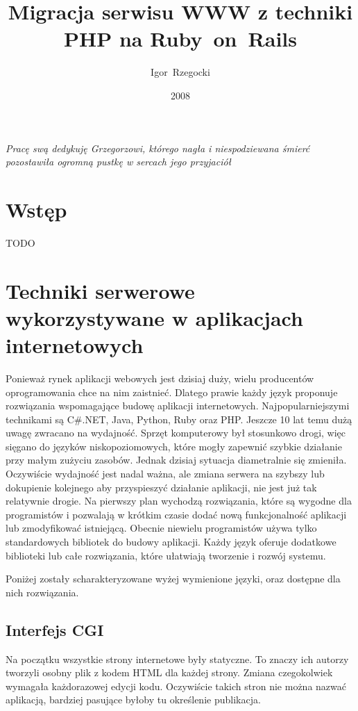 \documentclass[a4paper,12pt,oneside]{report}
\author{Igor~Rzegocki}
\title{Migracja serwisu WWW z techniki PHP na Ruby~on~Rails}
\date{2008}
\begin{document}

\thispagestyle{empty}
\begin{flushright}
\vspace*{13cm}
\emph{Pracę swą dedykuję Grzegorzowi, którego nagła i niespodziewana śmierć pozostawiła ogromną pustkę w sercach jego przyjaciół}
\end{flushright}


\tableofcontents

\chapter{Wstęp}
\label{cha:wstep}

TODO

\chapter[Techniki po stronie serwera]{Techniki serwerowe wykorzystywane w aplikacjach internetowych}
\label{cha:serwer}

Ponieważ rynek aplikacji webowych jest dzisiaj duży, wielu producentów oprogramowania chce na nim zaistnieć. Dlatego prawie każdy język proponuje rozwiązania wspomagające budowę aplikacji internetowych. Najpopularniejszymi technikami są C\#.NET, Java, Python, Ruby oraz PHP. Jeszcze 10 lat temu dużą uwagę zwracano na wydajność. Sprzęt komputerowy był stosunkowo drogi, więc sięgano do języków niskopoziomowych, które mogły zapewnić szybkie działanie przy małym zużyciu zasobów. Jednak dzisiaj sytuacja diametralnie się zmieniła. Oczywiście wydajność jest nadal ważna, ale zmiana serwera na szybszy lub dokupienie kolejnego aby przyspieszyć działanie aplikacji, nie jest już tak relatywnie drogie. Na pierwszy plan wychodzą rozwiązania, które są wygodne dla programistów i pozwalają w krótkim czasie dodać nową funkcjonalność aplikacji lub zmodyfikować istniejącą. Obecnie niewielu programistów używa tylko standardowych bibliotek do budowy aplikacji. Każdy język oferuje dodatkowe biblioteki lub całe rozwiązania, które ułatwiają tworzenie i rozwój systemu. 

Poniżej zostały scharakteryzowane wyżej wymienione języki, oraz dostępne dla nich rozwiązania.

\section{Interfejs CGI}
\label{sec:cgi}
Na początku wszystkie strony internetowe były statyczne. To znaczy ich autorzy tworzyli osobny plik z kodem HTML dla każdej strony. Zmiana czegokolwiek wymagała każdorazowej edycji kodu. Oczywiście takich stron nie można nazwać aplikacją, bardziej pasujące byłoby tu określenie publikacja.
\end{document}
